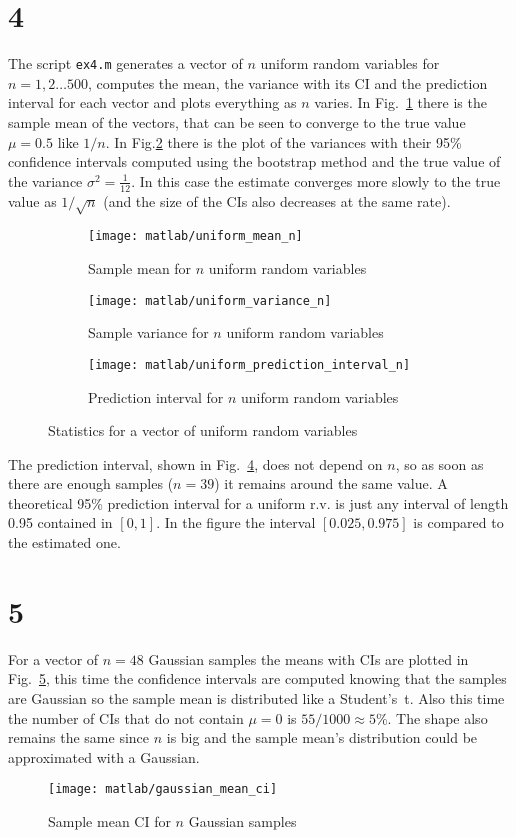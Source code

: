 \documentclass{article}
\newcommand{\inlinecode}[1]{\lstinline[basicstyle=\ttfamily,keywordstyle={}]{#1}}
\begin{document}
\section*{4}
The script \inlinecode{ex4.m} generates a vector of $n$ uniform random
variables for $n = 1,2\dots500$, computes the mean, the variance with
its CI and the prediction interval for each vector and plots
everything as $n$ varies. In Fig.~\ref{uniform_mean} there is the
sample mean of the vectors, that can be seen to converge to the true
value $\mu=0.5$ like $1/n$. In Fig.\ref{uniform_var} there is the plot
of the variances with their 95\% confidence intervals computed using
the bootstrap method and the true value of the variance $\sigma^2 =
\frac{1}{12}$. In this case the estimate converges more slowly to the
true value as $1/\sqrt{n}$ (and the size of the CIs also decreases at
the same rate).
\begin{figure}[htbp]
  \centering
  \begin{subfigure}{.5\textwidth}
    \centering
    \texttt{[image: matlab/uniform\_mean\_n]}
    \caption{Sample mean for $n$ uniform random variables}
    \label{uniform_mean}
    \end{subfigure}%
  \begin{subfigure}{.5\textwidth}
    \centering
    \texttt{[image: matlab/uniform\_variance\_n]}
    \caption{Sample variance for $n$ uniform random variables}
    \label{uniform_var}
  \end{subfigure}
  \begin{subfigure}{.5\textwidth}
    \centering
    \texttt{[image: matlab/uniform\_prediction\_interval\_n]}
    \caption{Prediction interval for $n$ uniform random variables}
    \label{pred_int_unif}  
  \end{subfigure}
  \caption{Statistics for a vector of uniform random variables}
\end{figure}
The prediction interval, shown in Fig.~\ref{pred_int_unif}, does not
depend on $n$, so as soon as there are enough samples ($n=39$) it
remains around the same value. A theoretical 95\% prediction interval
for a uniform r.v. is just any interval of length 0.95 contained in
$[0,1]$. In the figure the interval $[0.025, 0.975]$ is compared to
the estimated one.
\section*{5}
For a vector of $n = 48$ Gaussian samples the means with CIs are
plotted in Fig.~\ref{gaussian_mean_ci}, this time the confidence
intervals are computed knowing that the samples are Gaussian so the
sample mean is distributed like a Student's~t. Also this time the
number of CIs that do not contain $\mu=0$ is $55/1000 \approx 5\%$.
The shape also remains the same since $n$ is big and the sample mean's
distribution could be approximated with a Gaussian.
\begin{figure}[htbp]
  \centering
  \texttt{[image: matlab/gaussian\_mean\_ci]}
  \caption{Sample mean CI for $n$ Gaussian samples}
  \label{gaussian_mean_ci}
\end{figure}
\end{document}
